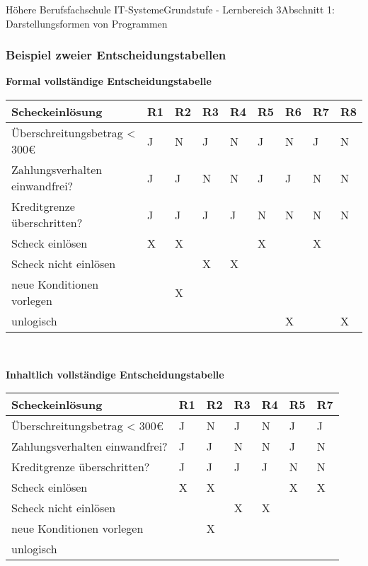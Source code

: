 \documentclass[11pt,oneside,openany,headings=optiontotoc,11pt,numbers=noenddot]{article}
\begin{document}
\begin{worksheet}{Höhere Berufsfachschule IT-Systeme}{Grundstufe - Lernbereich 3}{Abschnitt 1: Darstellungsformen von Programmen}
		\subsubsection*{Beispiel zweier Entscheidungstabellen}
		\textbf{Formal vollständige Entscheidungstabelle}\\
		\begin{tabularx}{\textwidth}{|l||M|M|M|M|M|M|M|M|}
			\hline
			\textbf{Scheckeinlösung} & \textbf{R1} & \textbf{R2} & \textbf{R3} & \textbf{R4} & \textbf{R5} & \textbf{R6} & \textbf{R7} & \textbf{R8}\\
			\hline
			Überschreitungsbetrag < 300\euro & J & N & J & N & J & N & J & N\\
			\hline
			Zahlungsverhalten einwandfrei? & J & J & N & N & J & J & N & N\\
			\hline
			Kreditgrenze überschritten? & J & J & J & J & N & N & N & N\\
			\hline
			\hline
			Scheck einlösen & X & X & & & X & & X & \\
			\hline
			Scheck nicht einlösen & & & X & X & & & & \\
			\hline
			neue Konditionen vorlegen & & X & & & & & & \\
			\hline
			unlogisch & & & & & & X & & X \\
			\hline
		\end{tabularx}\\
		\par\noindent
		\textbf{Inhaltlich vollständige Entscheidungstabelle}\\
		\begin{tabularx}{\textwidth}{|l||M|M|M|M|M|M|}
			\hline
			\textbf{Scheckeinlösung} & \textbf{R1} & \textbf{R2} & \textbf{R3} & \textbf{R4} & \textbf{R5} & \textbf{R7}\\
			\hline
			Überschreitungsbetrag < 300\euro & J & N & J & N & J & J \\
			\hline
			Zahlungsverhalten einwandfrei? & J & J & N & N & J & N \\
			\hline
			Kreditgrenze überschritten? & J & J & J & J & N & N \\
			\hline
			\hline
			Scheck einlösen & X & X & & & X & X \\
			\hline
			Scheck nicht einlösen & & & X & X & & \\
			\hline
			neue Konditionen vorlegen & & X & & & & \\
			\hline
			unlogisch & & & & & & \\
			\hline
		\end{tabularx}\\

\end{worksheet}
\end{document}
